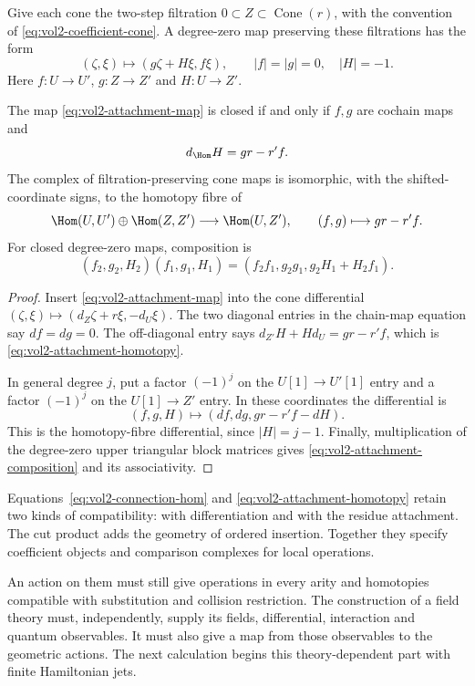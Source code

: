 Give each cone the two-step filtration
$0\subset Z\subset\operatorname{Cone}(r)$, with the convention
of \eqref{eq:vol2-coefficient-cone}. A degree-zero map preserving
these filtrations has the form
\begin{equation}\label{eq:vol2-attachment-map}
 (\zeta,\xi)\longmapsto(g\zeta+H\xi,f\xi),\qquad
 |f|=|g|=0,\quad |H|=-1.
\end{equation}
Here $f:U\to U'$, $g:Z\to Z'$ and $H:U\to Z'$.

\begin{lemma}\label{lem:vol2-attachment-homotopy}
The map \eqref{eq:vol2-attachment-map} is closed if and only if
$f,g$ are cochain maps and
\begin{equation}\label{eq:vol2-attachment-homotopy}
 d_{\Hom}H=gr-r'f.
\end{equation}
The complex of filtration-preserving cone maps is isomorphic,
with the shifted-coordinate signs, to the homotopy fibre of
\[
 \Hom(U,U')\oplus\Hom(Z,Z')\longrightarrow\Hom(U,Z'),
 \qquad(f,g)\longmapsto gr-r'f.
\]
For closed degree-zero maps, composition is
\begin{equation}\label{eq:vol2-attachment-composition}
 (f_2,g_2,H_2)(f_1,g_1,H_1)
 =(f_2f_1,g_2g_1,g_2H_1+H_2f_1).
\end{equation}
\end{lemma}

\begin{proof}
Insert \eqref{eq:vol2-attachment-map} into the cone differential
$(\zeta,\xi)\mapsto(d_Z\zeta+r\xi,-d_U\xi)$. The two diagonal entries in the
chain-map equation say $df=dg=0$. The off-diagonal entry says
$d_{Z'}H+Hd_U=gr-r'f$, which is
\eqref{eq:vol2-attachment-homotopy}.

In general degree $j$, put a factor $(-1)^j$ on the $U[1]\to U'[1]$
entry and a factor $(-1)^j$ on the $U[1]\to Z'$ entry.
In these coordinates the differential is
\[
 (f,g,H)\longmapsto
 (df,dg,gr-r'f-dH).
\]
This is the homotopy-fibre differential, since
$|H|=j-1$. Finally, multiplication of the degree-zero upper triangular
block matrices gives \eqref{eq:vol2-attachment-composition} and
its associativity.
\end{proof}

Equations~\eqref{eq:vol2-connection-hom} and
\eqref{eq:vol2-attachment-homotopy} retain two kinds of compatibility:
with differentiation and with the residue attachment. The cut product
adds the geometry of ordered insertion. Together they specify
coefficient objects and comparison complexes for local operations.

An action on them must still give operations in every arity and
homotopies compatible with substitution and collision restriction.
The construction of a field theory must, independently, supply its
fields, differential, interaction and quantum observables.
It must also give a map from those observables to the geometric actions.
The next calculation
begins this theory-dependent part with finite Hamiltonian jets.
